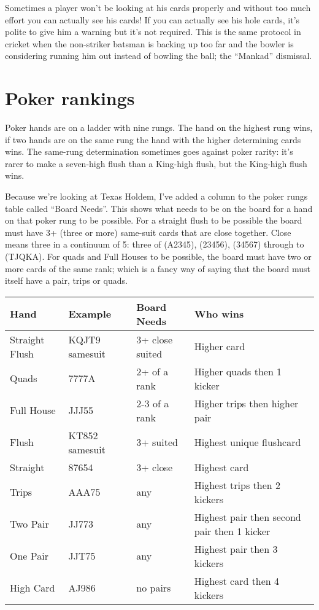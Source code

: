 Sometimes a player won't be looking at his cards properly and without
too much effort you can actually see his cards! If
you can actually see his hole cards, it's polite to give him a
warning but it's not required. This is the same protocol in cricket
when the non-striker batsman is backing up too far and the bowler is
considering running him out instead of bowling the ball; the
``Mankad'' dismissal.

\section{Poker rankings}

Poker hands are on a ladder with nine rungs. The hand on
the highest rung wins, if two hands are on the same rung the hand with
the higher determining cards wins. The same-rung determination
sometimes goes against poker rarity: it's rarer to make a seven-high
flush than a King-high flush, but the King-high flush wins.

Because we're looking at Texas Holdem, I've added a column to the
poker rungs table called ``Board Needs''. This shows what needs to be
on the board for a hand on that poker rung to be possible. For a
straight flush to be possible the board must have 3+ (three or more)
same-suit cards that are close together. Close means three in a
continuum of 5: three of (A2345), (23456), (34567) through to
(TJQKA). For quads and Full Houses to be possible, the board must have
two or more cards of the same rank; which is a fancy way of saying
that the board must itself have a pair, trips or quads.


\begin{tabular}{|l|l|l|l|} \hline
Hand            & Example   & Board Needs    & Who wins \\ \hline
Straight Flush  & KQJT9 samesuit     & 3+ close suited &
Higher card \\ \hline
Quads           & 7777A     & 2+ of a rank   & Higher quads then
1 kicker \\ \hline
Full House      & JJJ55     & 2-3 of a rank  & Higher trips then
higher pair \\ \hline
Flush           & KT852 samesuit & 3+ suited & Highest unique flushcard
\\ \hline
Straight        & 87654     & 3+ close       & Highest card \\ \hline
Trips           & AAA75     & any            & Highest trips then 2
kickers \\ \hline
Two Pair        & JJ773     & any            & Highest pair then
second pair then 1 kicker \\ \hline
One Pair        & JJT75     & any            & Highest pair then 3
kickers \\ \hline
High Card       & AJ986     & no pairs       & Highest card then 4
kickers \\ \hline
\end{tabular}

